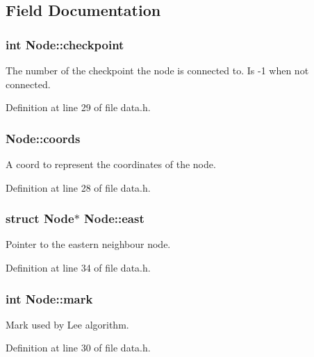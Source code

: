 \subsection{Field Documentation}
\hypertarget{struct_node_ad537ee1e0731b7e91067a1450ddb9ee6}{
\subsubsection[{checkpoint}]{\setlength{\rightskip}{0pt plus 5cm}int Node\+::checkpoint}}\label{struct_node_ad537ee1e0731b7e91067a1450ddb9ee6}
The number of the checkpoint the node is connected to. Is -\/1 when not connected. 

Definition at line 29 of file data.\+h.

\hypertarget{struct_node_a15d11412ba4f5fcc20d0e0eb6dc295f3}{
\subsubsection[{coords}]{ Node\+::coords}}\label{struct_node_a15d11412ba4f5fcc20d0e0eb6dc295f3}
A coord to represent the coordinates of the node. 

Definition at line 28 of file data.\+h.

\hypertarget{struct_node_a4157043bf98cb4865d59f3a59cdf5a55}{
\subsubsection[{east}]{\setlength{\rightskip}{0pt plus 5cm}struct {\bf Node}$\ast$ Node\+::east}}\label{struct_node_a4157043bf98cb4865d59f3a59cdf5a55}
Pointer to the eastern neighbour node. 

Definition at line 34 of file data.\+h.

\hypertarget{struct_node_ade86011a84d36d228fd060457a570ad5}{
\subsubsection[{mark}]{\setlength{\rightskip}{0pt plus 5cm}int Node\+::mark}}\label{struct_node_ade86011a84d36d228fd060457a570ad5}
Mark used by Lee algorithm. 

Definition at line 30 of file data.\+h.

